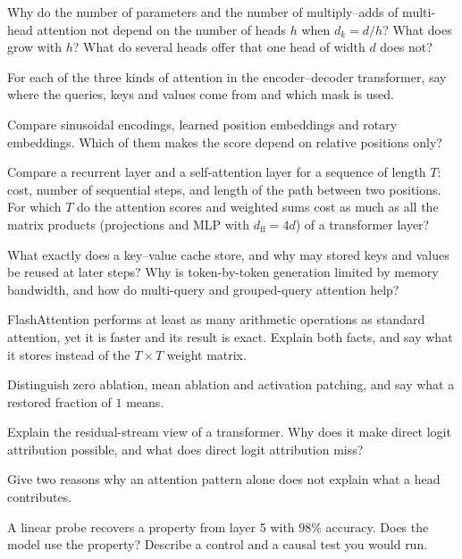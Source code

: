 \documentclass[11pt]{article}
\begin{document}
\begin{questions}
\begin{conceptual}
\item Why do the number of parameters and the number of multiply--adds of multi-head attention not depend on the number of
  heads $h$ when $d_k = d/h$? What does grow with $h$? What do several heads offer that one head of width $d$ does not?
\item For each of the three kinds of attention in the encoder--decoder transformer, say where the queries, keys and values
  come from and which mask is used.
\item Compare sinusoidal encodings, learned position embeddings and rotary embeddings. Which of them makes the score depend on
  relative positions only?
\item Compare a recurrent layer and a self-attention layer for a sequence of length $T$: cost, number of sequential steps,
  and length of the path between two positions. For which $T$ do the attention scores and weighted sums cost as much as
  all the matrix products (projections and MLP with $d_{\mathrm{ff}} = 4d$) of a transformer layer?
\item What exactly does a key--value cache store, and why may stored keys and values be reused at later steps? Why is
  token-by-token generation limited by memory bandwidth, and how do multi-query and grouped-query attention help?
\item FlashAttention performs at least as many arithmetic operations as standard attention, yet it is faster and its result
  is exact. Explain both facts, and say what it stores instead of the $T \times T$ weight matrix.
\item Distinguish zero ablation, mean ablation and activation patching, and say what a restored fraction of $1$ means.
\item Explain the residual-stream view of a transformer. Why does it make direct logit attribution possible, and what does
  direct logit attribution miss?
\item Give two reasons why an attention pattern alone does not explain what a head contributes.
\item A linear probe recovers a property from layer 5 with $98\%$ accuracy. Does the model use the property? Describe a
  control and a causal test you would run.
\end{conceptual}


\end{questions}
\end{document}
